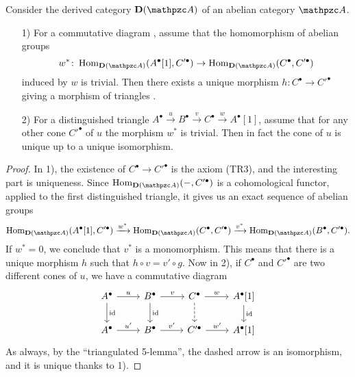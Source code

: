 \begin{observation}
  \label{TR3-TR1-with-uniqueness-general-statement}

  Consider the derived category $\categ{D} (\vcateg{A})$ of an abelian category
  $\vcateg{A}$.

  \begin{enumerate}
  \item[1)] For a commutative diagram , assume that the
    homomorphism of abelian groups
    \[ w^*\colon \Hom_{\categ{D} (\vcateg{A})} (A^\bullet [1], C'^\bullet) \to
      \Hom_{\categ{D} (\vcateg{A})} (C^\bullet, C'^\bullet) \]
    induced by $w$ is trivial. Then there exists a unique morphism
    $h\colon C^\bullet \to C'^\bullet$ giving a morphism of triangles
    .

  \item[2)] For a distinguished triangle
    $A^\bullet \xrightarrow{u} B^\bullet \xrightarrow{v} C^\bullet \xrightarrow{w} A^\bullet[1]$,
    assume that for any other cone $C'^\bullet$ of $u$ the morphism $w^*$ is
    trivial. Then in fact the cone of $u$ is unique up to a unique isomorphism.
  \end{enumerate}

  \begin{proof} In 1), the existence of $C^\bullet \to C'^\bullet$ is the axiom
    (TR3), and the interesting part is uniqueness. Since
    $\Hom_{\categ{D} (\vcateg{A})} (-, C'^\bullet)$ is a cohomological functor,
    applied to the first distinguished triangle, it gives us an exact sequence
    of abelian groups
    \[ \Hom_{\categ{D} (\vcateg{A})} (A^\bullet [1], C'^\bullet) \xrightarrow{w^*}
      \Hom_{\categ{D} (\vcateg{A})} (C^\bullet, C'^\bullet) \xrightarrow{v^*}
      \Hom_{\categ{D} (\vcateg{A})} (B^\bullet, C'^\bullet). \]
    If $w^* = 0$, we conclude that $v^*$ is a monomorphism. This means that
    there is a unique morphism $h$ such that $h\circ v = v'\circ g$. Now in 2),
    if $C^\bullet$ and $C'^\bullet$ are two different cones of $u$, we have a
    commutative diagram
    \[ \begin{tikzcd}
        A^\bullet\ar{r}{u}\ar{d}{\idid} & B^\bullet\ar{r}{v}\ar{d}{\idid} & C^\bullet\ar{r}{w}\ar[dashed]{d} & A^\bullet [1]\ar{d}{\idid} \\
        A^\bullet\ar{r}{u'} & B^\bullet\ar{r}{v'} & C'^\bullet\ar{r}{w'} & A^\bullet [1]
      \end{tikzcd} \]
    As always, by the ``triangulated 5-lemma'', the dashed arrow is an
    isomorphism, and it is unique thanks to 1).
  \end{proof}
\end{observation}

